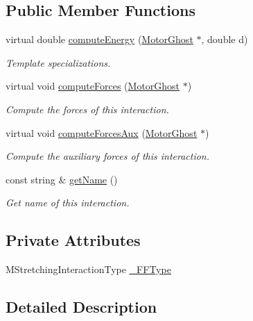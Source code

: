 \subsection*{Public Member Functions}
\begin{DoxyCompactItemize}
\item 
virtual double \hyperlink{classMotorGhostStretching_a312918e34e4c72a13230453aab1ed6cc}{compute\+Energy} (\hyperlink{classMotorGhost}{Motor\+Ghost} $\ast$, double d)
\begin{DoxyCompactList}\small\item\em Template specializations. \end{DoxyCompactList}\item 
virtual void \hyperlink{classMotorGhostStretching_a82fa0820554eab9136432b39561a50a1}{compute\+Forces} (\hyperlink{classMotorGhost}{Motor\+Ghost} $\ast$)
\begin{DoxyCompactList}\small\item\em Compute the forces of this interaction. \end{DoxyCompactList}\item 
virtual void \hyperlink{classMotorGhostStretching_ac1751d735f89869423de4ae04641e0c2}{compute\+Forces\+Aux} (\hyperlink{classMotorGhost}{Motor\+Ghost} $\ast$)
\begin{DoxyCompactList}\small\item\em Compute the auxiliary forces of this interaction. \end{DoxyCompactList}\item 
const string \& \hyperlink{classMotorGhostInteractions_a7cb8fb7e66fbf572423c8af9919bba48}{get\+Name} ()
\begin{DoxyCompactList}\small\item\em Get name of this interaction. \end{DoxyCompactList}\end{DoxyCompactItemize}
\subsection*{Private Attributes}
\begin{DoxyCompactItemize}
\item 
M\+Stretching\+Interaction\+Type \hyperlink{classMotorGhostStretching_a855ea87698428cdc04f0fa690e4c1571}{\+\_\+\+F\+F\+Type}
\end{DoxyCompactItemize}


\subsection{Detailed Description}
